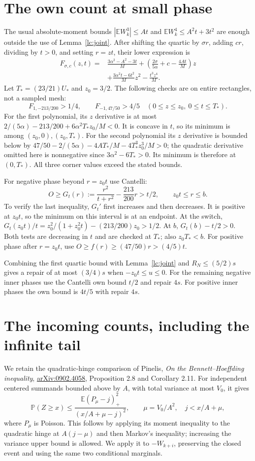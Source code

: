 \documentclass[11pt]{article}
\newcommand{\E}{\mathbb E}
\newcommand{\Pp}{\mathbb P}
\begin{document}
\section{The own count at small phase}
The usual absolute-moment bounds
$|\E W_k^3|\le At$ and $\E W_k^4\le A^2t+3t^2$ are enough
outside the use of Lemma~\ref{lc:joint}.
After shifting the quartic by $\sigma r$, adding $cr$, dividing by
$t>0$, and setting $r=zt$, their lower expression is
\begin{align*}
 F_{\sigma,c}(z,t)={}&\frac{3\alpha^2-A^2-3t}{M}
 +\left(\frac{2\sigma}{5\alpha}+c-\frac{4At}{M}\right)z\\
 &+\frac{3\alpha^2t-6t^2}{M}z^2-\frac{t^3z^4}{M}.
\end{align*}
Let $T_*=(23/21)U_*$ and $z_0=3/2$. The following checks are
on entire rectangles, not a sampled mesh:
\[
 F_{1,-213/200}>1/4,\qquad F_{-1,47/50}>4/5
       \quad(0\le z\le z_0,\ 0\le t\le T_*).
\]
For the first polynomial, its $z$ derivative is at most
$2/(5\alpha)-213/200+6\alpha^2T_*z_0/M<0$.
It is concave in $t$, so its minimum is among $(z_0,0),(z_0,T_*)$.
For the second polynomial its $z$ derivative is bounded below by
$47/50-2/(5\alpha)-4AT_*/M-4T_*^3z_0^3/M>0$;
the quadratic derivative omitted here is nonnegative since
$3\alpha^2-6T_*>0$. Its minimum is therefore at $(0,T_*)$.
All three corner values exceed the stated bounds.

For negative phase beyond $r=z_0t$ use Cantelli:
\[
 O\ge G_t(r):=\frac{r^2}{t+r^2}-\frac{213}{200}r>t/2,
                         \qquad z_0t\le r\le b.
\]
To verify the last inequality, $G_t'$ first increases and then decreases.
It is positive at $z_0t$, so the minimum on this interval is at an
endpoint. At the switch,
$G_t(z_0t)/t=z_0^2/(1+z_0^2t)-(213/200)z_0>1/2$.
At $b$, $G_t(b)-t/2>0$. Both tests are decreasing in $t$ and are
checked at $T_*$; also $z_0T_*<b$.
For positive phase after $r=z_0t$, use
$O\ge f(r)\ge(47/50)r>(4/5)t$.

Combining the first quartic bound with Lemma~\ref{lc:joint} and
$R_N\le(5/2)s$ gives a repair of at most $(3/4)s$ when
$-z_0t\le u\le0$. For the remaining negative inner phases use the
Cantelli own bound $t/2$ and repair $4s$. For positive inner phases
the own bound is $4t/5$ with repair $4s$.

\section{The incoming counts, including the infinite tail}
We retain the quadratic-hinge comparison of Pinelis,
\emph{On the Bennett--Hoeffding inequality},
\href{https://arxiv.org/abs/0902.4058}{arXiv:0902.4058},
Proposition 2.8 and Corollary 2.11. For independent centered summands
bounded above by $A$, with total variance at most $V_0$, it gives
\[
 \Pp(Z\ge x)\le\frac{\E(P_\mu-j)_+^2}{(x/A+\mu-j)^2},
 \qquad \mu=V_0/A^2,\quad j<x/A+\mu,
\]
where $P_\mu$ is Poisson. This follows by applying its moment inequality
to the quadratic hinge at $A(j-\mu)$ and then Markov's inequality;
increasing the variance upper bound is allowed. We apply it to $-W_{k+i}$,
preserving the closed event and using the same two conditional marginals.
\end{document}

